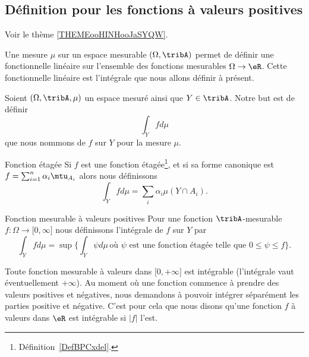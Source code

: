 \subsection{Définition pour les fonctions à valeurs positives}

Voir le thème \ref{THEMEooHINHooJaSYQW}.

Une mesure \( \mu\) sur un espace mesurable \( (\Omega,\tribA)\) permet de définir une fonctionnelle linéaire sur l'ensemble des fonctions mesurables \( \Omega\to \eR\). Cette fonctionnelle linéaire est l'intégrale que nous allons définir à présent.

\begin{definition}  \label{DefTVOooleEst}
    Soient \( (\Omega,\tribA,\mu)\) un espace mesuré ainsi que \( Y\in\tribA\). Notre but est de définir
    \begin{equation}
        \int_Yfd\mu
    \end{equation}
    que nous nommons  de \( f\) sur \( Y\) pour la mesure \( \mu\).
    \begin{subproof}
    \item[Fonction étagée]
        Si \( f\) est une fonction étagée\footnote{Définition~\ref{DefBPCxdel}.}, et si sa forme canonique est \( f=\sum_{i=1}^n\alpha_i\mtu_{A_i}\) alors nous définissons
    \begin{equation}        \label{EqooGAFMooZLzjPs}
        \int_Yfd\mu=\sum_i\alpha_i\mu(Y\cap A_i).
    \end{equation}

\item[Fonction mesurable à valeurs positives]
    Pour une fonction \( \tribA\)-mesurable \( f\colon \Omega\to \mathopen[ 0 , \infty \mathclose]\) nous définissons l'intégrale de \( f\) sur \( Y\) par
    \begin{equation}        \label{EqDefintYfdmu}
        \int_Yfd\mu=\sup\Big\{ \int_Y\psi d\mu\,\text{où } \psi\text{ est une fonction étagée telle que } 0\leq \psi\leq f \Big\}.
    \end{equation}

    \end{subproof}
\end{definition}

\begin{remark}
    Toute fonction mesurable à valeurs dans \(  \mathopen[ 0 , +\infty \mathclose]   \) est intégrable (l'intégrale vaut éventuellement \( +\infty\)). Au moment où une fonction commence à prendre des valeurs positives et négatives, nous demandons à pouvoir intégrer séparément les parties positive et négative. C'est pour cela que nous disons qu'une fonction \( f\) à valeurs dans \( \eR\) est intégrable si \( | f |\) l'est.
\end{remark}

